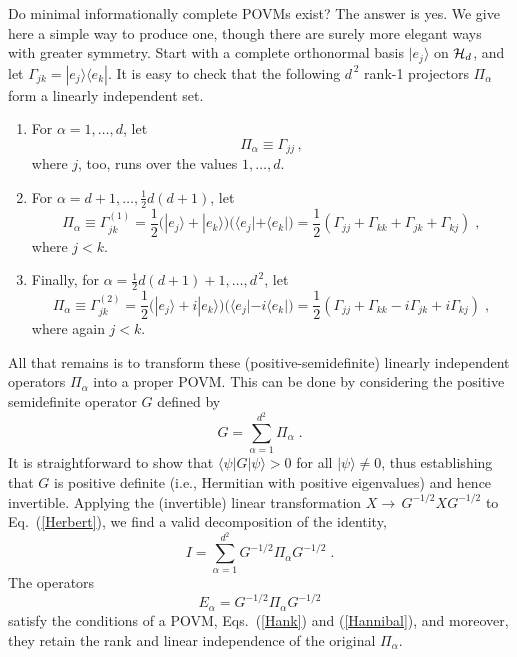 \documentclass[12pt,aps,eqsecnum]{revtex4-1}
\begin{document}
Do minimal informationally complete POVMs exist?  The answer is
yes. We give here a simple way to produce one, though there are
surely more elegant ways with greater symmetry. Start with a
complete orthonormal basis $|e_j\rangle$ on ${\cal H}_d$, and let
$\Gamma_{jk}=|e_j\rangle\langle e_k|$.  It is easy to check that
the following $d^{\,2}$ rank-1 projectors $\Pi_\alpha$ form a
linearly independent set.
\begin{enumerate}
\item For $\alpha=1,\ldots,d$, let
\begin{equation}
\Pi_\alpha \equiv \Gamma_{jj}\,,
\end{equation}
where $j$, too, runs over the values $1,\ldots,d$.

\item For $\alpha=d+1,\ldots,\frac{1}{2}d(d+1)$, let
\begin{equation}
\Pi_\alpha \equiv \Gamma^{(1)}_{jk} =
\frac{1}{2}\Big(|e_j\rangle+|e_k\rangle\Big)
\Big(\langle e_j|+\langle e_k|\Big)
=
\frac{1}{2}(\Gamma_{jj}+\Gamma_{kk}+\Gamma_{jk}+\Gamma_{kj})\;,
\end{equation}
where $j<k$.

\item Finally, for $\alpha= \frac{1}{2}d(d+1) + 1, \ldots,d^{\,2}$, let
\begin{equation}
\Pi_\alpha \equiv \Gamma^{(2)}_{jk}
= \frac{1}{2}\Big(|e_j\rangle+i|e_k\rangle\Big)
\Big(\langle e_j|-i\langle e_k |\Big)
=\frac{1}{2}(\Gamma_{jj}+\Gamma_{kk}-i\Gamma_{jk}+i\Gamma_{kj})\;,
\end{equation}
where again $j<k$.
\end{enumerate}
All that remains is to transform these (positive-semidefinite)
linearly independent operators $\Pi_\alpha$ into a proper POVM.
This can be done by considering the positive semidefinite operator
$G$ defined by
\begin{equation}
G=\sum_{\alpha=1}^{d^2}\Pi_\alpha\;.
\label{Herbert}
\end{equation}
It is straightforward to show that $\langle\psi|G|\psi\rangle>0$
for all $|\psi\rangle\ne0$, thus establishing that $G$ is positive
definite (i.e., Hermitian with positive eigenvalues) and hence
invertible.  Applying the (invertible) linear transformation
$X\rightarrow\, G^{-1/2}XG^{-1/2}$ to Eq.~(\ref{Herbert}), we find
a valid decomposition of the identity,
\begin{equation}
I=\sum_{\alpha=1}^{d^2}G^{-1/2}\Pi_\alpha G^{-1/2}\;.
\end{equation}
The operators
\begin{equation}
E_\alpha=G^{-1/2}\Pi_\alpha G^{-1/2}
\end{equation}
satisfy the conditions of a POVM, Eqs.~(\ref{Hank}) and
(\ref{Hannibal}), and moreover, they retain the rank and
linear independence of the original $\Pi_\alpha$.
\end{document}
